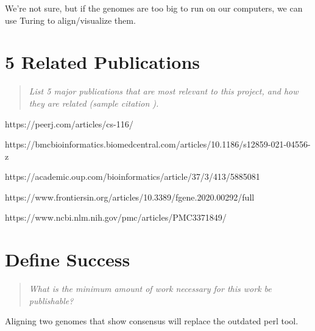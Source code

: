 \documentclass{proc}
\begin{document}
We're not sure, but if the genomes are too big to run on our computers, we can use Turing to align/visualize them.

\section{5 Related Publications}
\begin{quote}
\textit{List 5 major publications that are most relevant to this project, and how they are related (sample citation \cite{wijk2005value}).}
\end{quote}

https://peerj.com/articles/cs-116/

https://bmcbioinformatics.biomedcentral.com/articles/10.1186/s12859-021-04556-z

https://academic.oup.com/bioinformatics/article/37/3/413/5885081

https://www.frontiersin.org/articles/10.3389/fgene.2020.00292/full

https://www.ncbi.nlm.nih.gov/pmc/articles/PMC3371849/

\section{Define Success}
\begin{quote}
\textit{What is the minimum amount of work necessary for this work be publishable?}
\end{quote}

Aligning two genomes that show consensus will replace the outdated perl tool. 



\end{document}
